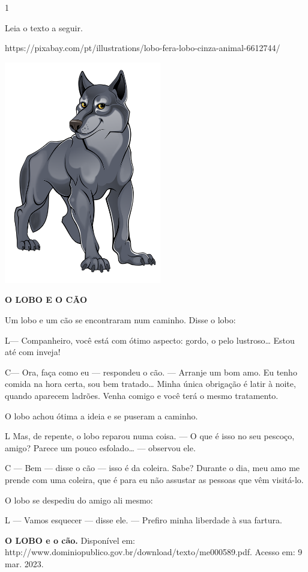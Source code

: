 \begin{itemize}
{{{\begin{itemize}
\begin{itemize}
\begin{itemize}
\num{1}

Leia o texto a seguir.

https://pixabay.com/pt/illustrations/lobo-fera-lobo-cinza-animal-6612744/

\includegraphics[width=2.69792in,height=3.82382in]{media/image22.png}

\textbf{O LOBO E O CÃO}

Um lobo e um cão se encontraram num caminho. Disse o lobo:

L--- Companheiro, você está com ótimo aspecto: gordo, o pelo
lustroso\ldots{} Estou até com inveja!

C--- Ora, faça como eu --- respondeu o cão. --- Arranje um bom amo. Eu
tenho comida na hora certa, sou bem tratado\ldots{} Minha única
obrigação é latir à noite, quando aparecem ladrões. Venha comigo e você
terá o mesmo tratamento.

O lobo achou ótima a ideia e se puseram a caminho.

L Mas, de repente, o lobo reparou numa coisa. --- O que é isso no seu
pescoço, amigo? Parece um pouco esfolado\ldots{} --- observou ele.

C --- Bem --- disse o cão --- isso é da coleira. Sabe? Durante o dia,
meu amo me prende com uma coleira, que é para eu não assustar as pessoas
que vêm visitá-lo.

O lobo se despediu do amigo ali mesmo:

L --- Vamos esquecer --- disse ele. --- Prefiro minha liberdade à sua
fartura.

\textbf{O LOBO e o cão.} Disponível em:
http://www.dominiopublico.gov.br/download/texto/me000589.pdf. Acesso em:
9 mar. 2023.


\end{itemize}
\end{itemize}
\end{itemize}}}}
\end{itemize}
